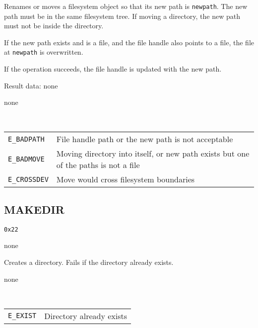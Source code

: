 Renames or moves a filesystem object so that its new path is {\tt newpath}. The new path must be in the same
filesystem tree. If moving a directory, the new path must not be inside the directory.

If the new path exists and is a file, and the file handle also points to a file, the file at {\tt newpath} is
overwritten.

If the operation succeeds, the file handle is updated with the new path.

Result data: none

\begin{description}[noitemsep,topsep=1pt]
	\item[Result data:] none
	\item[Specific errors:] \hfill \\
		\begin{tabular}{lp{10.5cm}}
			{\tt E\_BADPATH} & File handle path or the new path is not acceptable \\
			{\tt E\_BADMOVE} & Moving directory into itself, or new path exists but one of the
				paths is not a file \\
			{\tt E\_CROSSDEV} & Move would cross filesystem boundaries \\
		\end{tabular}
\end{description}

\subsection{MAKEDIR}

\begin{description}[noitemsep,topsep=1pt]
	\item[Code:] {\tt 0x22}
	\item[Arguments:] none
\end{description}

Creates a directory. Fails if the directory already exists.

\begin{description}[noitemsep,topsep=1pt]
	\item[Result data:] none
	\item[Specific errors:] \hfill \\
		\begin{tabular}{lp{10.5cm}}
			{\tt E\_EXIST} & Directory already exists \\
		\end{tabular}
\end{description}

